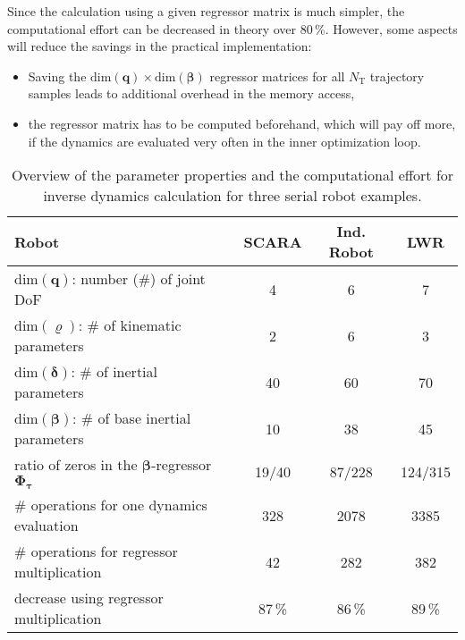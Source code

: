 \documentclass{svproc}
\newcommand{\bm}[1]{\boldsymbol{#1}}
\begin{document}
Since the calculation using a given regressor matrix is much simpler, the computational effort can be decreased in theory over 80\,\%.
However, some aspects will reduce the savings in the practical implementation:
\begin{itemize} 
\item Saving the $\mathrm{dim}(\bm{q}) \times \mathrm{dim}(\bm{\beta})$ regressor matrices for all $N_\mathrm{T}$ trajectory samples leads to additional overhead in the memory access,
\item the regressor matrix has to be computed beforehand, which will pay off more, if the dynamics are evaluated very often in the inner optimization loop.
\end{itemize}  



\begin{table}[tb]
    \caption{Overview of the parameter properties and the computational effort for inverse dynamics calculation for three serial robot examples.}
    \label{tab:computation}
    \centering
    \setlength\tabcolsep{3pt}
    \small
    \begin{tabular}[t]{|l|c|c|c|} 
        \hline
        Robot & SCARA & Ind. Robot & LWR \\
        \hline
        $\mathrm{dim}(\bm{q})$: number (\#) of joint DoF  & 4 & 6 & 7 \\
        $\mathrm{dim}(\bm{\varrho})$: \# of kinematic parameters & 2 & 6 & 3 \\
        $\mathrm{dim}(\bm{\delta})$: \# of inertial parameters & 40 & 60 & 70 \\
        $\mathrm{dim}(\bm{\beta})$: \# of base inertial parameters\footnotemark  & 10 & 38 & 45 \\
        ratio of zeros in the $\bm{\beta}$-regressor $\bm{\Phi}_{\bm{\tau}}$ & 19/40 & 87/228 & 124/315 \\
        \hline
        \# operations for one dynamics evaluation & 328 & 2078 & 3385 \\
        \# operations for regressor multiplication & 42 & 282 & 382 \\
        decrease using regressor multiplication & 87\,\% & 86\,\% & 89\,\% \\
        \hline
    \end{tabular}
    \vspace{-0.5cm}
\end{table}
\end{document}
